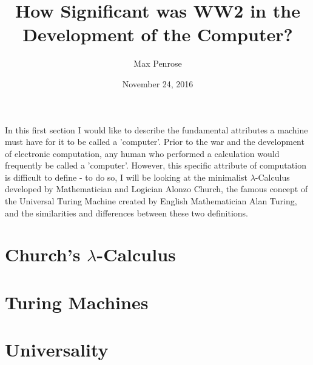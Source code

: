 \documentclass {article}
\title{How Significant was WW2 in the Development of the Computer?}
\date{November 24, 2016}
\author{Max Penrose}
\begin{document}
\maketitle
\tableofcontents


In this first section I would like to describe the fundamental attributes a machine must have for it to be called a 'computer'. Prior to the war and the development of electronic computation, any human who performed a calculation would  frequently be called a 'computer'. However, this specific attribute of computation is difficult to define - to do so, I will be looking at the minimalist  $\lambda$-Calculus developed by Mathematician and Logician Alonzo Church, the famous concept of the Universal Turing Machine created by English Mathematician Alan Turing, and the similarities and differences between these two definitions.


\section{Church's $\lambda$-Calculus}



\section{Turing Machines}



\section{Universality}


\end{document}

